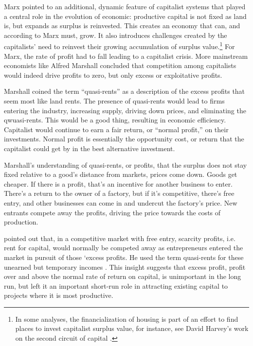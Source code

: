 Marx pointed to an additional, dynamic feature of capitalist systems that played a central role in the evolution of economic: productive capital is not fixed as land is, but expands as surplus is reinvested. This creates an economy that can, and according to Marx must, grow. It also introduces challenges created by the capitalists' need to reinvest their growing accumulation of surplus value.\footnote{In some analyses, the financialization of housing is part of an effort to find places to invest capitalist surplus value, for instance, see David Harvey's work on the second circuit of capital \cite{GET_david_harvey}.}  For Marx, the rate of profit had to fall leading to a capitalist crisis. More mainstream economists like Alfred Marshall concluded that competition among capitalists would indeed drive profits to zero, but only excess or exploitative profits. 



Marshall coined the term ``quasi-rents'' as a description of the excess profits that seem most like land rents. The presence of quasi-rents would lead to firms entering the industry, increasing supply, driving down prices, and eliminating the qwuasi-rents.  This would be a good thing, resulting in economic efficiency.   Capitalist would continue to earn a fair return, or ``normal profit,'' on their investments. Normal profit is essentially the opportunity cost, or return that the capitalist could get by in  the best alternative investment. 



 Marshall's understanding of quasi-rents, or profits, that the surplus does not stay fixed relative to a good's distance from markets, prices come down. Goods get cheaper. If there is a profit, that's an incentive for another business to enter. There's a return to the owner of a factory, but if it's \gls{competitive}, there's free entry, and other businesses can come in and undercut the factory's price. New entrants compete away the profits, driving the price towards the costs of production.


pointed out that, in a competitive market with free entry, scarcity profits, i.e. rent for capital, would normally be competed away as entrepreneurs entered the market in pursuit of those `excess profits. He used the term \glspl{quasi-rent} for these unearned but temporary incomes \cite{GET-Johnson-rent-econ-theory}.  %
This insight suggests that excess profit, profit over and above the normal rate of return on capital, is unimportant in the long run, but left it an important short-run role in attracting existing capital to projects where it is most productive.

